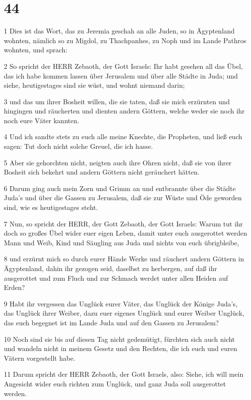 \chapter{44}

\par 1 Dies ist das Wort, das zu Jeremia geschah an alle Juden, so in Ägyptenland wohnten, nämlich so zu Migdol, zu Thachpanhes, zu Noph und im Lande Pathros wohnten, und sprach:
\par 2 So spricht der HERR Zebaoth, der Gott Israels: Ihr habt gesehen all das Übel, das ich habe kommen lassen über Jerusalem und über alle Städte in Juda; und siehe, heutigestages sind sie wüst, und wohnt niemand darin;
\par 3 und das um ihrer Bosheit willen, die sie taten, daß sie mich erzürnten und hingingen und räucherten und dienten andern Göttern, welche weder sie noch ihr noch eure Väter kannten.
\par 4 Und ich sandte stets zu euch alle meine Knechte, die Propheten, und ließ euch sagen: Tut doch nicht solche Greuel, die ich hasse.
\par 5 Aber sie gehorchten nicht, neigten auch ihre Ohren nicht, daß sie von ihrer Bosheit sich bekehrt und andern Göttern nicht geräuchert hätten.
\par 6 Darum ging auch mein Zorn und Grimm an und entbrannte über die Städte Juda's und über die Gassen zu Jerusalem, daß sie zur Wüste und Öde geworden sind, wie es heutigestages steht.
\par 7 Nun, so spricht der HERR, der Gott Zebaoth, der Gott Israels: Warum tut ihr doch so großes Übel wider euer eigen Leben, damit unter euch ausgerottet werden Mann und Weib, Kind und Säugling aus Juda und nichts von euch übrigbleibe,
\par 8 und erzürnt mich so durch eurer Hände Werke und räuchert andern Göttern in Ägyptenland, dahin ihr gezogen seid, daselbst zu herbergen, auf daß ihr ausgerottet und zum Fluch und zur Schmach werdet unter allen Heiden auf Erden?
\par 9 Habt ihr vergessen das Unglück eurer Väter, das Unglück der Könige Juda's, das Unglück ihrer Weiber, dazu euer eigenes Unglück und eurer Weiber Unglück, das euch begegnet ist im Lande Juda und auf den Gassen zu Jerusalem?
\par 10 Noch sind sie bis auf diesen Tag nicht gedemütigt, fürchten sich auch nicht und wandeln nicht in meinem Gesetz und den Rechten, die ich euch und euren Vätern vorgestellt habe.
\par 11 Darum spricht der HERR Zebaoth, der Gott Israels, also: Siehe, ich will mein Angesicht wider euch richten zum Unglück, und ganz Juda soll ausgerottet werden.
